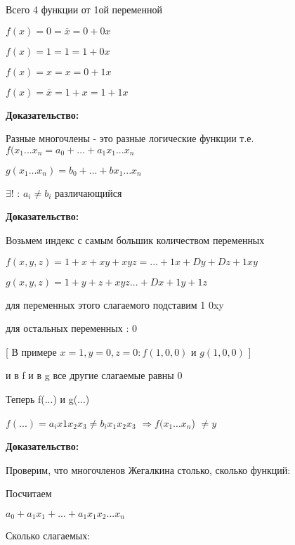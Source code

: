 \documentclass[russian]{lecture-notes}
\begin{document}
\begin{sloppypar}
\begin{proposition}
            \begin{remark}
                Всего 4 функции от 1ой переменной

                $f(x) = 0 = \overline{x} = 0 + 0x$

                $f(x) = 1 = 1 = 1 + 0x$

                $f(x) = x = x = 0 + 1x$

                $f(x) = \overline{x} = 1 + x = 1 + 1x$
            \end{remark}

            \textbf{Доказательство:}

            \begin{definition}
                Разные многочлены - это разные логические функции т.е. $f(x_{1} ... x_{n} = a_{0} + ... + a_{1}x_{1} ... x_{n}$

                $g(x_{1}...x_{n}) = b_{0} + ... + bx_{1} ... x_{n}$

                $\exists!$ : $a_{i} \neq b_{i}$ различающийся

            \end{definition}

            \qquad \textbf{Доказательство:}

            Возьмем индекс с самым большик количеством переменных

            $f(x,y,z) = 1 + x + xy + xyz = ... + 1x + Dy + Dz + 1xy$

            $g(x,y,z) = 1 + y + z + xyz ... + Dx + 1y + 1z$

            для переменных этого слагаемого подставим 1 0xy

            для остальных переменных : 0

            [ В примере $x=1,y=0,z=0 : f(1,0,0)$ и $g(1,0,0)$ ]

            и в f и в g все другие слагаемые равны 0

            Теперь f(...) и g(...)

            $f(...) = a_{i}x{1}x_{2}x_{3} \neq b_{i}x_{1}x_{2}x_{3}$ $\Rightarrow f(x_{1}...x_{n}$) $\neq y$

            \qquad \textbf{Доказательство:}

            Проверим, что многочленов Жегалкина столько, сколько функций:

            Посчитаем

            $a_{0} + a_{1}x_{1}+ ... + a_{1}x_{1}x_{2}...x_{n}$

            Сколько слагаемых:


\end{proposition}
\end{sloppypar}
\end{document}
